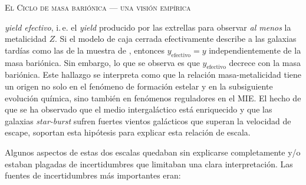 \documentclass[xcolor=dvipsnames,4pt,hyperref={colorlinks,citecolor=black,linkcolor=black,urlcolor=black}]{beamer}
\begin{document}
\begin{frame}[allowframebreaks]{\textsc{El Ciclo de masa bariónica --- una visión empírica}}
\begin{description}
\emph{yield efectivo}, i.\,e. el \emph{yield} producido por las extrellas para observar \emph{al
menos} la metalicidad $Z$. Si el modelo de caja cerrada efectivamente describe a las galaxias
tardías como las de la muestra de \citeauthor{Tremonti2004}, entonces $y_\text{efectivo}=y$
independientemente de la masa bariónica. Sin embargo, lo que se observa es que $y_\text{efectivo}$
decrece con la masa bariónica.
Este hallazgo se interpreta como que la relación masa-metalicidad tiene un origen no solo en el
fenómeno de formación estelar y en la subsiguiente evolución química, sino también en fenómenos
reguladores en el MIE. El hecho de que se ha observado que el medio intergaláctico está enriquecido
y que las galaxias \emph{star-burst} sufren fuertes vientos galácticos que superan la velocidad de
escape, soportan esta hipótesis para explicar esta relación de escala.
%
\end{description}

Algunos aspectos de estas dos escalas quedaban sin explicarse completamente y/o estaban plagadas de
incertidumbres que limitaban una clara interpretación. Las fuentes de incertidumbres más importantes
eran:


\end{frame}
\end{document}
